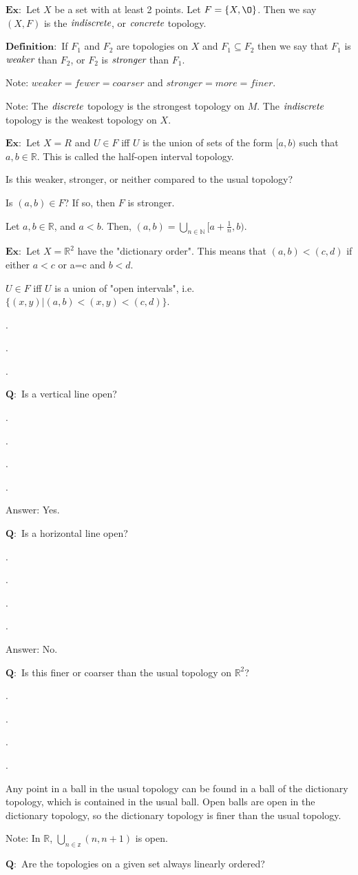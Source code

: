 \documentclass{article}
\begin{document}
$\mathbf{Ex:}$  Let $X$ be a set with at least 2 points.  Let $F=\{X,\O\}$.  Then we say $(X,F)$ is the $\emph{indiscrete}$, or $\emph{concrete}$ topology.

$\mathbf{Definition:}$  If $F_{1}$ and $F_{2}$ are topologies on $X$ and $F_{1}\subseteq F_{2}$ then we say that $F_{1}$ is $\emph{weaker}$ than $F_{2}$, or $F_{2}$ is $\emph{stronger}$ than $F_{1}$.

Note:  $weaker = fewer = coarser$ and $stronger = more =finer$.

Note: The $\emph{discrete}$ topology is the strongest topology on $M$.  The $\emph{indiscrete}$ topology is the weakest topology on $X$.

$\mathbf{Ex:}$  Let $X=R$ and $U\in F$ iff $U$ is the union of sets of the form $[a,b)$ such that $a,b\in \mathbb{R}$.  This is called the half-open interval topology.

Is this weaker, stronger, or neither compared to the usual topology?

Is $(a,b) \in F$?  If so, then $F$ is stronger.

Let $a,b \in \mathbb{R}$, and $a<b$.  Then, $(a,b)=\bigcup_{n\in \mathbb{N}}[a+\frac{1}{n},b)$.

$\mathbf{Ex:}$ Let $X=\mathbb{R}^{2}$ have the "dictionary order".  This means that $(a,b)<(c,d)$ if either $a<c$ or a=c and $b<d$.

$U\in F$ iff $U$ is a union of "open intervals", i.e. $\{(x,y)|(a,b)<(x,y)<(c,d)\}$.

.

.

.

$\mathbf{Q:}$ Is a vertical line open?  

.

.

.

.

Answer: Yes.

$\mathbf{Q:}$  Is a horizontal line open?

.

.

.

.

Answer: No.

$\mathbf{Q:}$  Is this finer or coarser than the usual topology on $\mathbb{R}^{2}$?

.

.

.

.

Any point in a ball in the usual topology can be found in a ball of the dictionary topology, which is contained in the usual ball.  Open balls are open in the dictionary topology, so the dictionary topology is finer than the usual topology.

Note: In $\mathbb{R}$, $\bigcup_{n\in \mathbb{z}}(n,n+1)$ is open.

$\mathbf{Q:}$  Are the topologies on a given set always linearly ordered?

 
\end{document}
